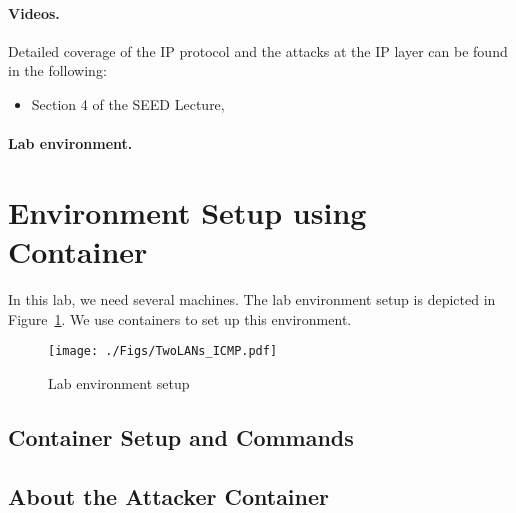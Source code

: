 \paragraph{Videos.}
Detailed coverage of the IP protocol and the attacks at the IP layer can be found 
in the following:

\begin{itemize}
\item Section 4 of the SEED Lecture, \seedisvideo
\end{itemize}


\paragraph{Lab environment.} \seedenvironmentC



\section{Environment Setup using Container}

In this lab, we need several machines. The lab
environment setup is depicted in Figure~\ref{ip:fig:labsetup}.
We use containers to set up this environment.


\begin{figure}[htb]
\begin{center}
\texttt{[image: ./Figs/TwoLANs\_ICMP.pdf]}
\end{center}
\caption{Lab environment setup}
\label{ip:fig:labsetup}
\end{figure}



\subsection{Container Setup and Commands}




\subsection{About the Attacker Container}

